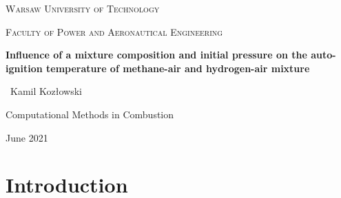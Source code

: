 \documentclass[a4paper,11pt]{article}
\begin{document}
\begin{titlepage}
	\centering
	{\scshape\LARGE Warsaw University of Technology \par}
	\vspace{1cm}
	{\scshape\Large Faculty of Power and Aeronautical Engineering\par}
	\vspace{3.5cm}
	{\huge\bfseries Influence of a mixture composition and initial pressure on the auto-ignition temperature of methane-air and hydrogen-air mixture\par}
	\vspace{2cm}
	{\Large\ Kamil Kozłowski\par}
	\vfill
	Computational Methods in Combustion\par

	\vfill

	{\large June 2021\par}
\end{titlepage}

\newpage
\tableofcontents

\newpage

 \section{Introduction}
    	
\end{document}
